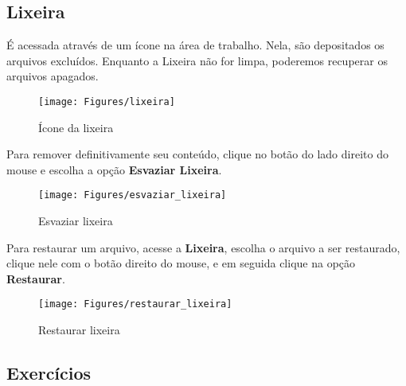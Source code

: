 \documentclass[12pt]{article}
\begin{document}
		\subsection{Lixeira}
		
		É acessada através de um ícone na área de trabalho. Nela, são depositados os arquivos excluídos. Enquanto a Lixeira não for limpa, poderemos recuperar os arquivos apagados.
		
		\begin{figure}[!h]
			\centering
			\texttt{[image: Figures/lixeira]}
			\caption{Ícone da lixeira}
			\label{fig:lixeira}
		\end{figure}
		\newpage
		Para remover definitivamente seu conteúdo, clique no botão do lado direito do mouse e escolha a opção {\bf Esvaziar Lixeira}.
		
		\begin{figure}[!h]
			\centering
			\texttt{[image: Figures/esvaziar\_lixeira]}
			\caption{Esvaziar lixeira}
			\label{fig:esvaziar_lixeira}
		\end{figure}
		
		Para restaurar um arquivo, acesse a {\bf Lixeira}, escolha o arquivo a ser restaurado, clique nele com o botão direito do mouse, e em seguida clique na opção {\bf Restaurar}.
		
		\begin{figure}[!h]
			\centering
			\texttt{[image: Figures/restaurar\_lixeira]}
			\caption{Restaurar lixeira}
			\label{fig: restaurar_lixeira}
		\end{figure}
		
		\subsection{Exercícios}
		
\end{document}
